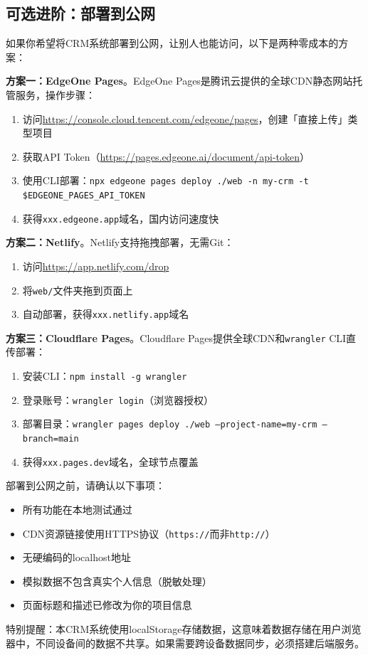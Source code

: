 \subsection{可选进阶：部署到公网}

如果你希望将CRM系统部署到公网，让别人也能访问，以下是两种零成本的方案：

\textbf{方案一：EdgeOne Pages}。EdgeOne Pages是腾讯云提供的全球CDN静态网站托管服务，操作步骤：
\begin{enumerate}[leftmargin=2em]
  \item 访问\url{https://console.cloud.tencent.com/edgeone/pages}，创建「直接上传」类型项目
  \item 获取API Token（\url{https://pages.edgeone.ai/document/api-token}）
  \item 使用CLI部署：\texttt{npx edgeone pages deploy ./web -n my-crm -t \$EDGEONE\_PAGES\_API\_TOKEN}
  \item 获得\texttt{xxx.edgeone.app}域名，国内访问速度快
\end{enumerate}

\textbf{方案二：Netlify}。Netlify支持拖拽部署，无需Git：
\begin{enumerate}[leftmargin=2em]
  \item 访问\url{https://app.netlify.com/drop}
  \item 将\texttt{web/}文件夹拖到页面上
  \item 自动部署，获得\texttt{xxx.netlify.app}域名
\end{enumerate}

\textbf{方案三：Cloudflare Pages}。Cloudflare Pages提供全球CDN和\texttt{wrangler} CLI直传部署：
\begin{enumerate}[leftmargin=2em]
  \item 安装CLI：\texttt{npm install -g wrangler}
  \item 登录账号：\texttt{wrangler login}（浏览器授权）
  \item 部署目录：\texttt{wrangler pages deploy ./web --project-name=my-crm --branch=main}
  \item 获得\texttt{xxx.pages.dev}域名，全球节点覆盖
\end{enumerate}

\begin{warningbox}[部署前检查清单]
部署到公网之前，请确认以下事项：
\begin{itemize}[leftmargin=2em]
  \item 所有功能在本地测试通过
  \item CDN资源链接使用HTTPS协议（\texttt{https://}而非\texttt{http://}）
  \item 无硬编码的localhost地址
  \item 模拟数据不包含真实个人信息（脱敏处理）
  \item 页面标题和描述已修改为你的项目信息
\end{itemize}
特别提醒：本CRM系统使用localStorage存储数据，这意味着数据存储在用户浏览器中，不同设备间的数据不共享。如果需要跨设备数据同步，必须搭建后端服务。\end{warningbox}


